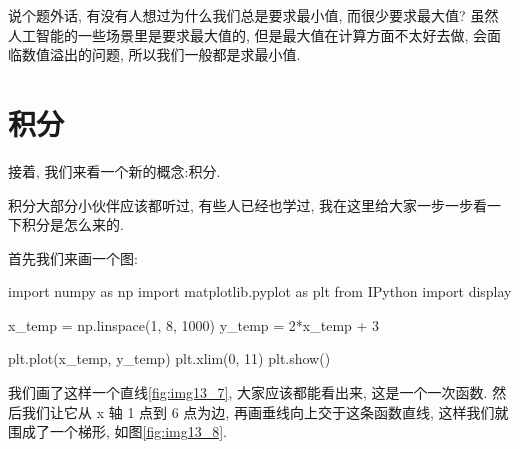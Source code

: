 说个题外话, 有没有人想过为什么我们总是要求最小值, 而很少要求最大值? 虽然人工智能的一些场景里是要求最大值的, 但是最大值在计算方面不太好去做, 会面临数值溢出的问题, 所以我们一般都是求最小值. 

\section{积分}

接着, 我们来看一个新的概念:积分. 

积分大部分小伙伴应该都听过, 有些人已经也学过, 我在这里给大家一步一步看一下积分是怎么来的. 

首先我们来画一个图:

\begin{python}
import numpy as np
import matplotlib.pyplot as plt
from IPython import display

x_temp = np.linspace(1, 8, 1000)
y_temp = 2*x_temp + 3


plt.plot(x_temp, y_temp)
plt.xlim(0, 11)
plt.show()
\end{python}

我们画了这样一个直线\ref{fig:img13_7}, 大家应该都能看出来, 这是一个一次函数. 然后我们让它从 x 轴 1 点到 6 点为边, 再画垂线向上交于这条函数直线, 这样我们就围成了一个梯形, 如图\ref{fig:img13_8}.

